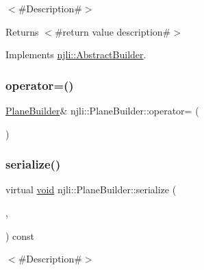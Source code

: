 $<$\#\+Description\#$>$

\begin{DoxyReturn}{Returns}
$<$\#return value description\#$>$ 
\end{DoxyReturn}


Implements \mbox{\hyperlink{classnjli_1_1_abstract_builder_a3e6e553e06d1ca30517ad5fb0bd4d000}{njli\+::\+Abstract\+Builder}}.

\mbox{\label{classnjli_1_1_plane_builder_afd2a66270153479a9fab0ff1be6052ab}} 
\subsubsection{\texorpdfstring{operator=()}{operator=()}}
{\footnotesize\ttfamily \mbox{\hyperlink{classnjli_1_1_plane_builder}{Plane\+Builder}}\& njli\+::\+Plane\+Builder\+::operator= (\begin{DoxyParamCaption}\item[{const \mbox{\hyperlink{classnjli_1_1_plane_builder}{Plane\+Builder}} \&}]{ }\end{DoxyParamCaption})\hspace{0.3cm}{\ttfamily [protected]}}

\mbox{\label{classnjli_1_1_plane_builder_aed67cdc952bfc0b7ef2b1a9012e99c14}} 
\subsubsection{\texorpdfstring{serialize()}{serialize()}}
{\footnotesize\ttfamily virtual \mbox{\hyperlink{_thread_8h_af1e856da2e658414cb2456cb6f7ebc66}{void}} njli\+::\+Plane\+Builder\+::serialize (\begin{DoxyParamCaption}\item[{\mbox{\hyperlink{_thread_8h_af1e856da2e658414cb2456cb6f7ebc66}{void}} $\ast$}]{,  }\item[{bt\+Serializer $\ast$}]{ }\end{DoxyParamCaption}) const\hspace{0.3cm}{\ttfamily [virtual]}}

$<$\#\+Description\#$>$


